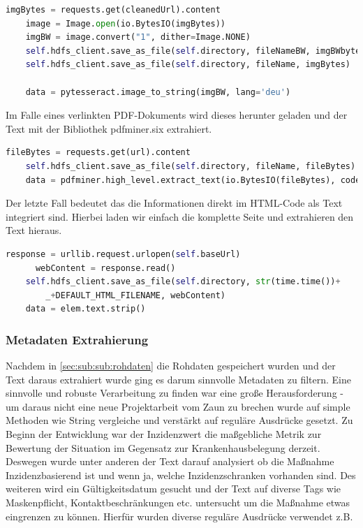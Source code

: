 \documentclass[12pt,oneside,a4paper,parskip]{scrbook}
\begin{document}
\begin{lstlisting}[caption=Schwarz-weiß Konvertierung, language=Python]
	imgBytes = requests.get(cleanedUrl).content
	image = Image.open(io.BytesIO(imgBytes))
	imgBW = image.convert("1", dither=Image.NONE)
	self.hdfs_client.save_as_file(self.directory, fileNameBW, imgBWbytes)
	self.hdfs_client.save_as_file(self.directory, fileName, imgBytes)

	data = pytesseract.image_to_string(imgBW, lang='deu')
\end{lstlisting}

Im Falle eines verlinkten PDF-Dokuments wird dieses herunter geladen und der Text mit der Bibliothek pdfminer.six extrahiert.

\begin{lstlisting}[caption=PDF Text Extraktion, language=Python]
	fileBytes = requests.get(url).content
	self.hdfs_client.save_as_file(self.directory, fileName, fileBytes)
	data = pdfminer.high_level.extract_text(io.BytesIO(fileBytes), codec="utf-8")
\end{lstlisting}

Der letzte Fall bedeutet das die Informationen direkt im HTML-Code als Text integriert sind. Hierbei laden wir einfach die komplette Seite und extrahieren den Text hieraus.

\begin{lstlisting}[caption=Website speichern, language=Python]
	response = urllib.request.urlopen(self.baseUrl)
      webContent = response.read()
	self.hdfs_client.save_as_file(self.directory, str(time.time())+
		_+DEFAULT_HTML_FILENAME, webContent)
	data = elem.text.strip()
\end{lstlisting}

\subsubsection{Metadaten Extrahierung}

Nachdem in \cref{sec:sub:sub:rohdaten} die Rohdaten gespeichert wurden und der Text daraus extrahiert wurde ging es darum sinnvolle Metadaten zu filtern. Eine sinnvolle und robuste Verarbeitung zu finden war eine große Herausforderung - um daraus nicht eine neue Projektarbeit vom Zaun zu brechen wurde auf simple Methoden wie String vergleiche und verstärkt auf reguläre Ausdrücke gesetzt. Zu Beginn der Entwicklung war der Inzidenzwert die maßgebliche Metrik zur Bewertung der Situation im Gegensatz zur Krankenhausbelegung derzeit. Deswegen wurde unter anderen der Text darauf analysiert ob die Maßnahme Inzidenzbasierend ist und wenn ja, welche Inzidenzschranken vorhanden sind. Des weiteren wird ein Gültigkeitsdatum gesucht und der Text auf diverse Tags wie Maskenpflicht, Kontaktbeschränkungen etc. untersucht um die Maßnahme etwas eingrenzen zu können. Hierfür wurden diverse reguläre Ausdrücke verwendet z.B.
\end{document}
